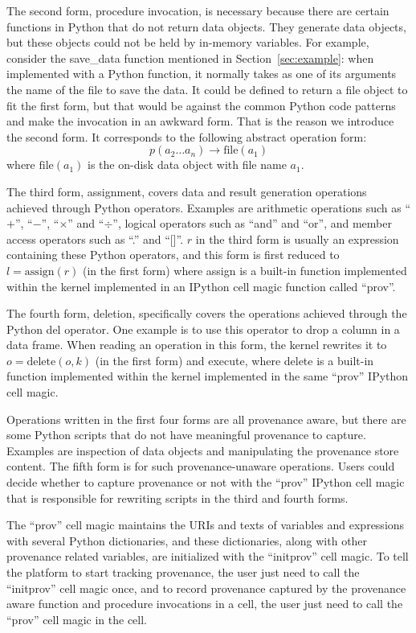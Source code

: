 The second form, procedure invocation, is necessary because there are certain functions in Python that do not return data objects. They generate data objects, but these objects could not be held by in-memory variables. For example, consider the save\_data function mentioned in Section~\ref{sec:example}: when implemented with a Python function, it normally takes as one of its arguments the name of the file to save the data. It could be defined to return a file object to fit the first form, but that would be against the common Python code patterns and make the invocation in an awkward form. That is the reason we introduce the second form. It corresponds to the following abstract operation form:
\begin{equation}
p(a_2\dots a_n)\rightarrow \textrm{file}(a_1)
\end{equation}
where $\textrm{file}(a_1)$ is the on-disk data object with file name $a_1$.

The third form, assignment, covers data and result generation operations achieved through Python operators. Examples are arithmetic operations such as ``$+$'', ``$-$'', ``$\times$'' and ``$\div$'', logical operators such as ``and'' and ``or'', and member access operators such as ``.'' and ``[]''. $r$ in the third form is usually an expression containing these Python operators, and this form is first reduced to $l = \textrm{assign}(r)$ (in the first form) where assign is a built-in function implemented within the kernel implemented in an IPython cell magic function called ``prov''.

The fourth form, deletion, specifically covers the operations achieved through the Python del operator. One example is to use this operator to drop a column in a data frame. When reading an operation in this form, the kernel rewrites it to $o = \textrm{delete}(o, k)$ (in the first form) and execute, where delete is a built-in function implemented within the kernel implemented in the same ``prov'' IPython cell magic.

Operations written in the first four forms are all provenance aware, but there are some Python scripts that do not have meaningful provenance to capture. Examples are inspection of data objects and manipulating the provenance store content. The fifth form is for such provenance-unaware operations. Users could decide whether to capture provenance or not with the ``prov'' IPython cell magic that is responsible for rewriting scripts in the third and fourth forms.

The ``prov'' cell magic maintains the URIs and texts of variables and expressions with several Python dictionaries, and these dictionaries, along with other provenance related variables, are initialized with the ``initprov'' cell magic. To tell the platform to start tracking provenance, the user just need to call the ``initprov'' cell magic once, and to record provenance captured by the provenance aware function and procedure invocations in a cell, the user just need to call the ``prov'' cell magic in the cell.

